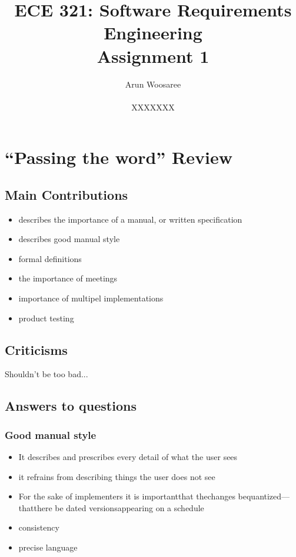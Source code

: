 \documentclass[letterpaper,12pt]{article}
\title{ECE 321: Software Requirements Engineering \\ Assignment 1}
\author{Arun Woosaree \\ \\ XXXXXXX}
\begin{document}
\maketitle

\section{``Passing the word'' Review}

\subsection{Main Contributions}
\begin{itemize}
 \item describes the importance of a manual, or written specification
 \item describes good manual style
 \item formal definitions
 \item the importance of meetings
 \item importance of multipel implementations
 \item product testing
\end{itemize}

\subsection{Criticisms}
Shouldn't be too bad...

\subsection{Answers to questions}
\subsubsection{Good manual style}
\begin{itemize}
 \item It describes  and  prescribes  every  detail  of  what  the  user sees
 \item it refrains from describing things the user does not see
 \item For  the  sake of  implementers  it is  importantthat  thechanges  bequantized—thatthere  be  dated versionsappearing  on a  schedule
 \item consistency
 \item precise language
\end{itemize}
\end{document}
